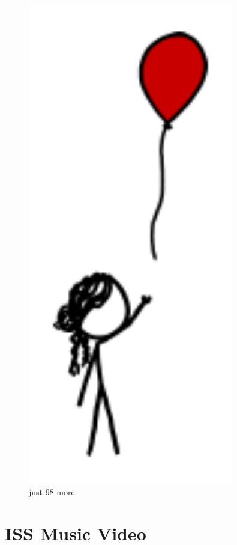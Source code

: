 {\begin{figure}[!htbp]
\centering
\includegraphics[scale=0.5, max width=0.8\textwidth]{imgs/a/44/high_throw_balloon.png}
\caption{just 98 more}
\end{figure}

{
\chapter{ISS Music Video}
}

}
